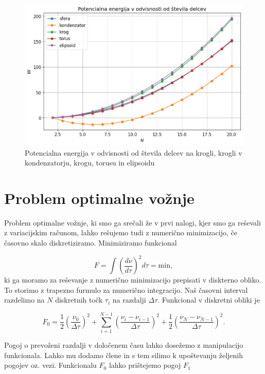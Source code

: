 \documentclass[slovene,11pt,a4paper]{article}
\begin{document}
\begin{figure}[h!]
\centering
\includegraphics[width=12.5cm]{energije2.png}
\caption{Potencialna energija v odvisnosti od števila delcev na krogli, krogli v kondenzatorju, krogu, torusu in elipsoidu}
\end{figure}

\section{Problem optimalne vožnje}

Problem optimalne vožnje, ki smo ga srečali že v prvi nalogi, kjer smo ga reševali z variacijskim računom, lahko rešujemo tudi z numerično minimizacijo, če časovno skalo diskretiziramo. Minimiziramo funkcional

\begin{equation}
F = \int \left( \frac{d\nu}{d\tau} \right)^2 d\tau = \text{min},
\end{equation}
ki ga moramo za reševanje z numerično minimizacijo prepisati v diskterno obliko. To storimo z trapezno furmulo za numerično integracijo. Naš časovni interval razdelimo na $N$ diskretnih točk $\tau_i$ na razdalji $\Delta\tau$. Funkcional v diskretni obliki je

\begin{equation}
F_0 = \frac{1}{2} \left( \frac{\nu_0}{\Delta \tau} \right)^2 + \sum_{i=1}^{N-1} \left( \frac{\nu_i - \nu_{i-1}}{\Delta \tau} \right)^2 + \frac{1}{2} \left( \frac{\nu_N - \nu_{N-1}}{\Delta \tau} \right)^2.
\end{equation}

Pogoj o prevoženi razdalji v določenem času lahko dosežemo z manipulacijo funkcionala. Lahko mu dodamo člene in s tem silimo k upoštevanju željenih pogojev oz. vezi. Funkcionalu $F_0$ lahko prištejemo pogoj $F_1$
\end{document}
